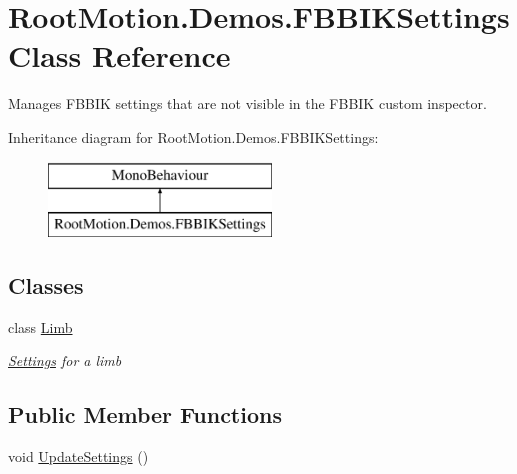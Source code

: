 \hypertarget{class_root_motion_1_1_demos_1_1_f_b_b_i_k_settings}{}\section{Root\+Motion.\+Demos.\+F\+B\+B\+I\+K\+Settings Class Reference}
\label{class_root_motion_1_1_demos_1_1_f_b_b_i_k_settings}


Manages F\+B\+B\+IK settings that are not visible in the F\+B\+B\+IK custom inspector.  


Inheritance diagram for Root\+Motion.\+Demos.\+F\+B\+B\+I\+K\+Settings\+:\begin{figure}[H]
\begin{center}
\leavevmode
\includegraphics[height=2.000000cm]{class_root_motion_1_1_demos_1_1_f_b_b_i_k_settings}
\end{center}
\end{figure}
\subsection*{Classes}
\begin{DoxyCompactItemize}
\item 
class \mbox{\hyperlink{class_root_motion_1_1_demos_1_1_f_b_b_i_k_settings_1_1_limb}{Limb}}
\begin{DoxyCompactList}\small\item\em \mbox{\hyperlink{class_settings}{Settings}} for a limb \end{DoxyCompactList}\end{DoxyCompactItemize}
\subsection*{Public Member Functions}
\begin{DoxyCompactItemize}
\item 
void \mbox{\hyperlink{class_root_motion_1_1_demos_1_1_f_b_b_i_k_settings_a52f18bfc4d5ae0c3757778c07a701473}{Update\+Settings}} ()
\end{DoxyCompactItemize}
